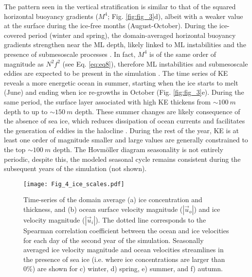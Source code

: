 \documentclass[draft]{agujournal2019}
\begin{document}
The pattern seen in the vertical stratification is similar to that of the squared horizontal buoyancy gradients ($M^4$; Fig. \ref{fig:fig_3}d), albeit with a weaker value at the surface during the ice-free months (August-October). During the ice-covered period (winter and spring), the domain-averaged horizontal buoyancy gradients strengthen near the ML depth, likely linked to ML instabilities and the presence of submesoscale processes \citep{Timmermans_horizontal_2012}. In fact, $M^4$ is of the same order of magnitude as $N^2f^2$ (see Eq. \ref{eq:eq8}), therefore ML instabilities and submesoscale eddies are expected to be present in the simulation \citep{FoxKemper_eddies_2008}.
The time series of KE reveals a more energetic ocean in summer, starting when the ice starts to melt (June) and ending when ice re-growths in October (Fig. \ref{fig:fig_3}e). During the same period, the surface layer associated with high KE thickens from $\sim 100\ m$ depth to up to $\sim 150\ m$ depth. These summer changes are likely consequence of the absence of sea ice, which reduces dissipation of ocean currents and facilitates the generation of eddies in the halocline \citep{Zhao_eddy_2014}. During the rest of the year, KE is at least one order of magnitude smaller and large values are generally constrained to the top $\sim 100\ m$ depth. The Hovm\"oller diagram seasonality is not entirely periodic, despite this, the modeled seasonal cycle remains consistent during the subsequent years of the simulation (not shown).

\begin{figure}[t!]
  \texttt{[image: Fig\_4\_ice\_scales.pdf]}
  \caption{Time-series of the domain average (a) ice concentration and thickness, and (b) ocean surface velocity magnitude ($|\vec{u}_o|$) and ice velocity magnitude ($|\vec{u}_i|$). The dotted line corresponds to the Spearman correlation coefficient between the ocean and ice velocities for each day of the second year of the simulation. Seasonally averaged ice velocity magnitude and ocean velocities streamlines in the presence of sea ice (i.e. where ice concentrations are larger than 0\%) are shown for c) winter, d) spring, e) summer, and f) autumn.}
  \label{fig:fig_4}
\end{figure}
\end{document}

